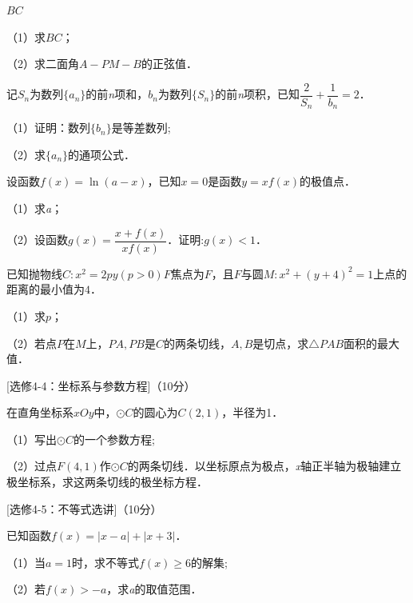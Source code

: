 \documentclass[a4paper,11pt]{report}
\begin{document}
\begin{examanswers}[start=17]
$BC$

（1）求$BC$；

（2）求二面角$A-PM-B$的正弦值．

\item 
记$S_{n}$为数列$\{a_{n}\}$的前\emph{n}项和，$b_{n}$为数列$\{S_{n}\}$的前\emph{n}项积，已知$\dfrac{2}{S_{n}}+\dfrac{1}{b_{n}}=2$．

（1）证明：数列$\{b_{n}\}$是等差数列;

（2）求$\{a_{n}\}$的通项公式．

\item 
设函数$f(x)=\ln(a-x)$，已知$x=0$是函数$y=xf(x)$的极值点．

（1）求\emph{a}；

（2）设函数$g(x)=\dfrac{x+f(x)}{xf(x)}$．证明:$g(x)<1$．

\item 
已知抛物线$C:x^{2}=2py(p>0)$$F$焦点为$F$，且$F$与圆$M:x^{2}+(y+4)^{2}=1$上点的距离的最小值为$4$．

（1）求$p$；

（2）若点$P$在$M$上，$PA,PB$是$C$的两条切线，$A,B$是切点，求$\ensuremath{\triangle}PAB$面积的最大值．


{{[}选修4-4：坐标系与参数方程{]}（10分）}

\item 
在直角坐标系$xOy$中，$⊙C$的圆心为$C(2,1)$，半径为1．

（1）写出$⊙C$的一个参数方程;

（2）过点$F(4,1)$作$⊙C$的两条切线．以坐标原点为极点，\emph{x}轴正半轴为极轴建立极坐标系，求这两条切线的极坐标方程．

{{[}选修4-5：不等式选讲{]}（10分）}

\item 
已知函数$f(x)=|x-a|+|x+3|$．

（1）当$a=1$时，求不等式$f(x)\geq6$的解集;

（2）若$f(x)>-a$，求\emph{a}的取值范围．
\end{examanswers}
\end{document}
